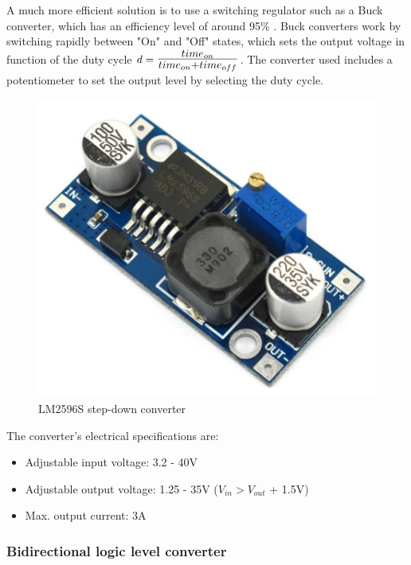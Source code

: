 		A much more efficient solution is to use a switching regulator such as a Buck converter, which has an efficiency level of around 95\%  \cite{buck}. 
		Buck converters work by switching rapidly between "On" and "Off" states, which sets the output voltage in function of the duty cycle $d=\mbox{\Large $\frac{time_{on}}{time_{on}+time_{off}}$}$. The converter used includes a potentiometer to set the output level by selecting the duty cycle. 
 
		

			\begin{figure}[H]
					\centering
					\includegraphics[scale=0.2]{images/ProjectComponents/buck.jpg}
					\caption{LM2596S step-down converter }
					\label{}
			\end{figure}
			\bigskip

		The converter's electrical specifications are:
			\begin{itemize}
				\item Adjustable input voltage: 3.2 - 40V
				\item Adjustable output voltage: 1.25 - 35V ($V_{in} > V_{out}$ + 1.5V)       
				\item Max. output current: 3A
			\end{itemize}

	\newpage
	\subsubsection{Bidirectional logic level converter}

